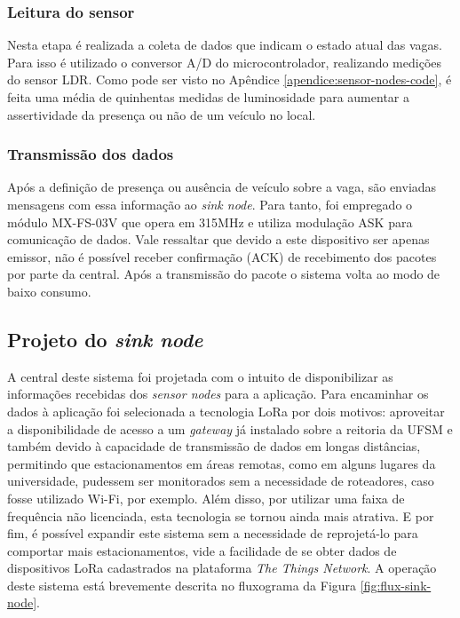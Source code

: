 \documentclass[oneside,openright,12pt]{ufsm_2015} %
\begin{document}
    \subsubsection{Leitura do sensor}
    Nesta etapa é realizada a coleta de dados que indicam o estado atual das vagas. Para isso é utilizado o conversor A/D do microcontrolador, realizando medições do sensor LDR. Como pode ser visto no Apêndice \ref{apendice:sensor-nodes-code}, é feita uma média de quinhentas medidas de luminosidade para aumentar a assertividade da presença ou não de um veículo no local.
    
    \subsubsection{Transmissão dos dados}
    Após a definição de presença ou ausência de veículo sobre a vaga, são enviadas mensagens com essa informação ao \textit{sink node}. Para tanto, foi empregado o módulo MX-FS-03V que opera em 315MHz e utiliza modulação ASK para comunicação de dados. Vale ressaltar que devido a este dispositivo ser apenas emissor, não é possível receber confirmação (ACK) de recebimento dos pacotes por parte da central. Após a transmissão do pacote o sistema volta ao modo de baixo consumo.
    
    \subsection{Projeto do \textit{sink node}}
    A central deste sistema foi projetada com o intuito de disponibilizar as informações recebidas dos \textit{sensor nodes} para a aplicação. Para encaminhar os dados à aplicação foi selecionada a tecnologia LoRa por dois motivos: aproveitar a disponibilidade de acesso a um \textit{gateway} já instalado sobre a reitoria da UFSM e também devido à capacidade de transmissão de dados em longas distâncias, permitindo que estacionamentos em áreas remotas, como em alguns lugares da universidade, pudessem ser monitorados sem a necessidade de roteadores, caso fosse utilizado Wi-Fi, por exemplo. Além disso, por utilizar uma faixa de frequência não licenciada, esta tecnologia se tornou ainda mais atrativa. E por fim, é possível expandir este sistema sem a necessidade de reprojetá-lo para comportar mais estacionamentos, vide a facilidade de se obter dados de dispositivos LoRa cadastrados na plataforma \textit{The Things Network}. A operação deste sistema está brevemente descrita no fluxograma da Figura \ref{fig:flux-sink-node}.
    
\end{document}
